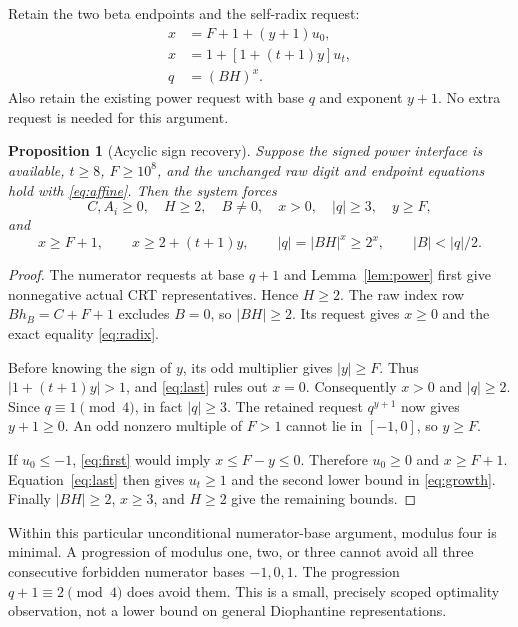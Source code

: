 \documentclass[11pt]{article}
\newtheorem{proposition}[theorem]{Proposition}
\theoremstyle{remark}\newtheorem{remark}[theorem]{Remark}
\begin{document}
Retain the two beta endpoints and the self-radix request:
\begin{align}
 x&=F+1+(y+1)u_0,\label{eq:first}\\
 x&=1+[1+(t+1)y]u_t,\label{eq:last}\\
 q&=(BH)^x.\label{eq:radix}
\end{align}
Also retain the existing power request with base $q$ and exponent $y+1$.
No extra request is needed for this argument.

\begin{proposition}[Acyclic sign recovery]\label{prop:signs}
Suppose the signed power interface is available, $t\ge8$, $F\ge10^8$,
and the unchanged raw digit and endpoint equations hold with
\eqref{eq:affine}. Then the system forces
\[
 C,A_i\ge0,\quad H\ge2,\quad B\ne0,\quad x>0,\quad |q|\ge3,
 \quad y\ge F,
\]
and
\begin{equation}\label{eq:growth}
 x\ge F+1,\qquad x\ge2+(t+1)y,\qquad
 |q|=|BH|^x\ge2^x,\qquad |B|<|q|/2.
\end{equation}
\end{proposition}
\begin{proof}
The numerator requests at base $q+1$ and Lemma~\ref{lem:power} first
give nonnegative actual CRT representatives. Hence $H\ge2$. The raw
index row $Bh_B=C+F+1$ excludes $B=0$, so $|BH|\ge2$. Its request
gives $x\ge0$ and the exact equality \eqref{eq:radix}.

Before knowing the sign of $y$, its odd multiplier gives $|y|\ge F$.
Thus $|1+(t+1)y|>1$, and \eqref{eq:last} rules out $x=0$.
Consequently $x>0$ and $|q|\ge2$. Since $q\equiv1\pmod4$, in fact
$|q|\ge3$. The retained request $q^{y+1}$ now gives $y+1\ge0$.
An odd nonzero multiple of $F>1$ cannot lie in $[-1,0]$, so $y\ge F$.

If $u_0\le-1$, \eqref{eq:first} would imply $x\le F-y\le0$.
Therefore $u_0\ge0$ and $x\ge F+1$. Equation~\eqref{eq:last} then
gives $u_t\ge1$ and the second lower bound in \eqref{eq:growth}.
Finally $|BH|\ge2$, $x\ge3$, and $H\ge2$ give the remaining bounds.
\end{proof}

Within this particular unconditional numerator-base argument, modulus
four is minimal. A progression of modulus one, two, or three cannot
avoid all three consecutive forbidden numerator bases $-1,0,1$.
The progression $q+1\equiv2\pmod4$ does avoid them. This is a small,
precisely scoped optimality observation, not a lower bound on general
Diophantine representations.
\end{document}
